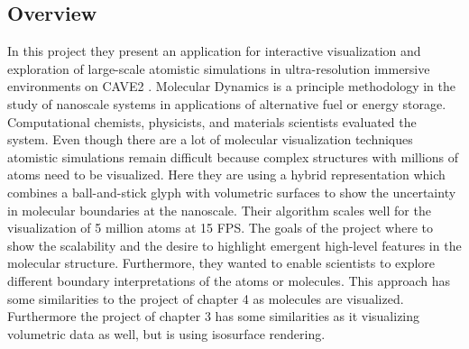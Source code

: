\documentclass[10pt,twocolumn,letterpaper]{article}
\begin{document}
\subsection{Overview}
In this project \cite{reda_visualizing_2013} they present an application for interactive visualization and exploration of large-scale atomistic simulations in ultra-resolution immersive environments on CAVE2 \cite{febretti2013cave2}. Molecular Dynamics is a principle methodology in the study of nanoscale systems in applications of alternative fuel or energy storage. Computational chemists, physicists, and materials scientists evaluated the  system. Even though there are a lot of molecular visualization techniques atomistic simulations remain difficult because complex structures with millions of atoms need to be visualized. Here they are using a hybrid representation which combines a ball-and-stick glyph with volumetric surfaces to show the uncertainty in molecular boundaries at the nanoscale. Their algorithm scales well for the visualization of 5 million atoms at 15 FPS. The goals of the project where to show the scalability and the desire to highlight emergent high-level features in the molecular structure. Furthermore, they wanted to enable scientists to explore different boundary interpretations of the atoms or molecules. This approach has some similarities to the project of chapter 4 as molecules are visualized. Furthermore the project of chapter 3 has some similarities as it visualizing volumetric data as well, but is using isosurface rendering. 
\end{document}
